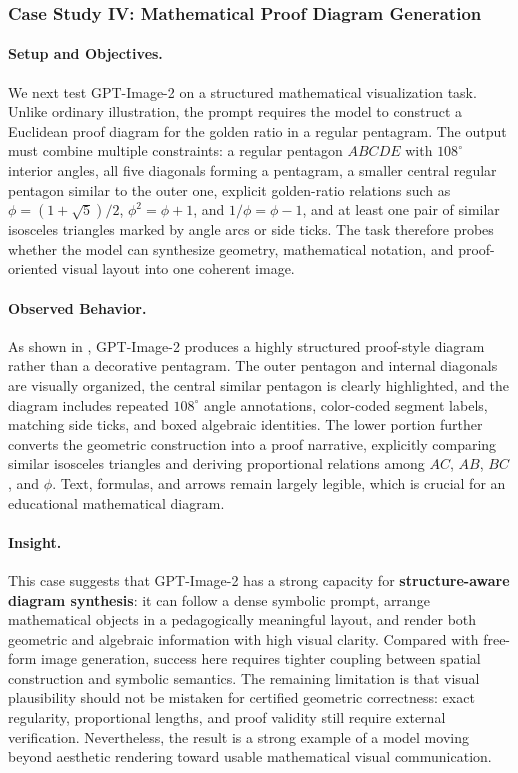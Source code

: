\subsubsection{Case Study IV: Mathematical Proof Diagram Generation}

\paragraph{Setup and Objectives.}
We next test GPT-Image-2 on a structured mathematical visualization task. Unlike ordinary illustration, the prompt requires the model to construct a Euclidean proof diagram for the golden ratio in a regular pentagram. The output must combine multiple constraints: a regular pentagon $ABCDE$ with $108^\circ$ interior angles, all five diagonals forming a pentagram, a smaller central regular pentagon similar to the outer one, explicit golden-ratio relations such as $\phi=(1+\sqrt{5})/2$, $\phi^2=\phi+1$, and $1/\phi=\phi-1$, and at least one pair of similar isosceles triangles marked by angle arcs or side ticks. The task therefore probes whether the model can synthesize geometry, mathematical notation, and proof-oriented visual layout into one coherent image.

\paragraph{Observed Behavior.}
As shown in , GPT-Image-2 produces a highly structured proof-style diagram rather than a decorative pentagram. The outer pentagon and internal diagonals are visually organized, the central similar pentagon is clearly highlighted, and the diagram includes repeated $108^\circ$ angle annotations, color-coded segment labels, matching side ticks, and boxed algebraic identities. The lower portion further converts the geometric construction into a proof narrative, explicitly comparing similar isosceles triangles and deriving proportional relations among $AC$, $AB$, $BC$, and $\phi$. Text, formulas, and arrows remain largely legible, which is crucial for an educational mathematical diagram.

\paragraph{Insight.}
This case suggests that GPT-Image-2 has a strong capacity for \textbf{structure-aware diagram synthesis}: it can follow a dense symbolic prompt, arrange mathematical objects in a pedagogically meaningful layout, and render both geometric and algebraic information with high visual clarity. Compared with free-form image generation, success here requires tighter coupling between spatial construction and symbolic semantics. The remaining limitation is that visual plausibility should not be mistaken for certified geometric correctness: exact regularity, proportional lengths, and proof validity still require external verification. Nevertheless, the result is a strong example of a model moving beyond aesthetic rendering toward usable mathematical visual communication.


